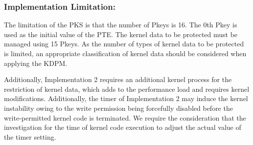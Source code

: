 \subsubsection{Implementation Limitation:}
The limitation of the PKS is that the number of Pkeys is 16. The 0th
Pkey is used as the initial value of the PTE.
The kernel data to be protected must be managed using 15 Pkeys.
%
%
As the number of types of kernel data to be protected is limited, an appropriate
classification of kernel data should be considered when applying the KDPM.

Additionally, Implementation 2 requires an additional kernel process for the restriction
of kernel data, which adds to the performance load and requires kernel
modifications. 
%
  Additionally, the timer of Implementation 2 may induce the kernel instability
  owing to the write permission being forcefully disabled before the
  write-permitted kernel code is terminated. We require the consideration that the
  investigation for the time of kernel code execution to adjust the actual value
  of the timer setting.

